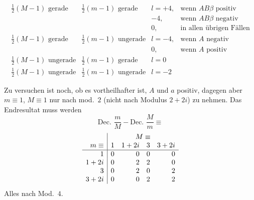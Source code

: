 \begingroup\small\setlength{\arraycolsep}{3pt}
\[
\begin{array}{ll|ll}
\frac12(M-1)\text{ gerade}&\frac12(m-1)\text{ gerade}&l=+4,&\text{wenn }AB\beta\text{ positiv}\\
&&-4,&\text{wenn }AB\beta\text{ negativ}\\
&&0,&\text{in allen übrigen Fällen}\\[3pt]
\frac12(M-1)\text{ gerade}&\frac12(m-1)\text{ ungerade}&l=-4,&\text{wenn }A\text{ negativ}\\
&&0,&\text{wenn }A\text{ positiv}\\[3pt]
\frac12(M-1)\text{ ungerade}&\frac12(m-1)\text{ gerade}&l=0&\\[3pt]
\frac12(M-1)\text{ ungerade}&\frac12(m-1)\text{ ungerade}&l=-2&
\end{array}
\]
\endgroup

Zu versuchen ist noch, ob es vortheilhafter ist, $A$ und $a$ positiv, dagegen aber $m\equiv1$, $M\equiv1$ nur nach mod.\ $2$ (nicht nach Modulus $2+2i$) zu nehmen. Das Endresultat muss werden
\[
\text{Dec. }\frac mM-\text{Dec. }\frac Mm\equiv
\]
\[
\begin{array}{r|rrrr}
&\multicolumn{4}{c}{M\equiv}\\
m\equiv&1&1+2i&3&3+2i\\\hline
1&0&0&0&0\\
1+2i&0&2&2&0\\
3&0&2&0&2\\
3+2i&0&0&2&2
\end{array}
\]
Alles nach Mod.\ $4$.
